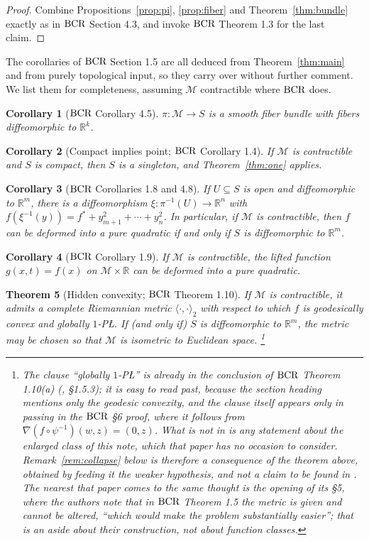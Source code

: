 \documentclass[11pt]{article}
\theoremstyle{plain}
\newtheorem{thm}{Theorem}[section]
\newtheorem{cor}[thm]{Corollary}
\theoremstyle{definition}
\theoremstyle{remark}
\newcommand{\M}{\mathcal{M}}
\newcommand{\R}{\mathbb{R}}
\newcommand{\bcr}{\textup{BCR}}
\begin{document}
\begin{proof}
Combine Propositions~\ref{prop:pi}, \ref{prop:fiber} and
Theorem~\ref{thm:bundle} exactly as in $\bcr$ Section 4.3, and invoke $\bcr$
Theorem 1.3 for the last claim.
\end{proof}

The corollaries of $\bcr$ Section 1.5 are all deduced from Theorem~\ref{thm:main}
and from purely topological input, so they carry over without further comment.
We list them for completeness, assuming $\M$ contractible where $\bcr$ does.

\begin{cor}[$\bcr$ Corollary 4.5]
$\pi\colon\M\to S$ is a smooth fiber bundle with fibers diffeomorphic to $\R^k$.
\end{cor}

\begin{cor}[Compact implies point; $\bcr$ Corollary 1.4]
If $\M$ is contractible and $S$ is compact, then $S$ is a singleton, and
Theorem~\ref{thm:one} applies.
\end{cor}

\begin{cor}[$\bcr$ Corollaries 1.8 and 4.8]
If $U\subseteq S$ is open and diffeomorphic to $\R^m$, there is a
diffeomorphism $\xi\colon\pi^{-1}(U)\to\R^n$ with
$f(\xi^{-1}(y)) = f^* + y_{m+1}^2+\cdots+y_n^2$. In particular, if $\M$ is
contractible, then $f$ can be deformed into a pure quadratic if and only if $S$
is diffeomorphic to $\R^m$.
\end{cor}

\begin{cor}[$\bcr$ Corollary 1.9]
If $\M$ is contractible, the lifted function $g(x,t) = f(x)$ on $\M\times\R$ can
be deformed into a pure quadratic.
\end{cor}

\begin{thm}[Hidden convexity; $\bcr$ Theorem 1.10]\label{thm:gconvex}
If $\M$ is contractible, it admits a complete Riemannian metric
$\langle\cdot,\cdot\rangle_2$ with respect to which $f$ is geodesically convex
and globally $1$-P\L{}. If (and only if) $S$ is diffeomorphic to $\R^m$, the
metric may be chosen so that $\M$ is isometric to Euclidean space.%
\footnote{The clause ``globally $1$-P\L{}'' is already in the conclusion of $\bcr$ Theorem
1.10(a) (\cite{BCR2026}, \S1.5.3); it is easy to read past, because the section
heading mentions only the geodesic convexity, and the clause itself appears only
in passing in the $\bcr$ \S6 proof, where it follows from
$\nabla(f\circ\psi^{-1})(w,z) = (0,z)$. What is \emph{not} in \cite{BCR2026} is
any statement about the enlarged class of this note, which that paper has no
occasion to consider. Remark~\ref{rem:collapse} below is therefore a consequence
of the theorem above, obtained by feeding it the weaker hypothesis, and not a
claim to be found in \cite{BCR2026}. The nearest that paper comes to the same
thought is the opening of its \S5, where the authors note that in $\bcr$ Theorem
1.5 the metric is given and cannot be altered, ``which would make the problem
substantially easier''; that is an aside about their construction, not about
function classes.}
\end{thm}
\end{document}

